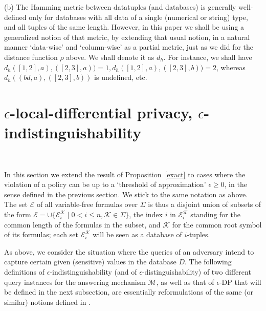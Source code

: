 \documentclass[pdflatex]{article}
\def \E {{\mathcal{E}}}
\def \K {{\mathcal{K}}}
\def \M {{\mathcal{M}}}
\begin{document}
   (b)  The Hamming metric between datatuples (and databases) is generally well-defined
   only for   databases with all data of a single (numerical or string) type, and all tuples
   of the   same length.  However, in   this paper we shall be using  a generalized notion
   of that   metric, by extending that  usual notion, in a natural manner `data-wise' and
   `column-wise' as a partial metric,  just as we did for the distance function $\rho$
   above. We shall denote it  as $d_h$. For instance, we shall have
   $d_h([1,2], a), ([2,3], a))=1, d_h([1,2], a), ([2,3], b))=2$, whereas
   $d_h((bd, a), ([2,3], b))$ is  undefined, etc. 
   
 \vspace*{-1.2em}
\section{{\large   $\epsilon$-local-differential  privacy,
      $\epsilon$-indistinguishability}}~\label{LDP}
 \vspace*{-1.5em}
 
 In this section we extend the result of  Proposition~\ref{exact} to cases  where  the
 violation of a policy  can be  up to  a `threshold of approximation' $\epsilon \ge0$,
 in the sense  defined in the previous section.
 We stick to the same notation as above. The  set  $\E$  of all variable-free formulas
 over $\Sigma$ is thus a disjoint union of  subsets  of the  form
 $\E = \cup \{\E^{\K}_i \mid 0 < i \le n, \K \in \Sigma\}$, the  index  $i$ in $\E^{\K}_i$
 standing for  the common length of the formulas in the subset, and $\K$  for the
 common  root symbol of its formulas; each  set $\E^{\K}_i$  will be seen as a
 database  of $i$-tuples. 
  
 As above, we consider the situation where the queries of an adversary intend  to capture
 certain  given (sensitive)  values  in the database $D$. The following  definitions of
 $\epsilon$-indistinguishability (and of $\epsilon$-distinguishability) of two different
 query instances for the answering mechanism $\M$,  as well as that of $\epsilon$-DP
 that will be defined in the next subsection, are essentially reformulations of the
 same (or similar)  notions defined in  \cite{Dwork2006,Dwork2014}.
 
\end{document}
